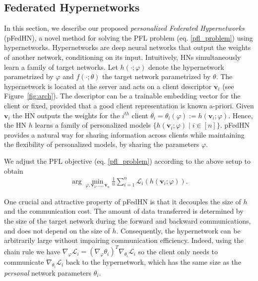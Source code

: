 \documentclass{article}
\def\gL{{\mathcal{L}}}
\newcommand{\bv}{\boldsymbol{v}}
\newcommand\ourmethod{pFedHN}
\begin{document}
\subsection{Federated Hypernetworks}
\label{fhn}



In this section,  we describe our proposed \textit{personalized Federated Hypernetworks} (\ourmethod{}), a novel method for solving the PFL problem (eq. \ref{pfl_problem}) using hypernetworks.
Hypernetworks are deep neural networks that output the weights of another network, conditioning on its input. Intuitively, HNs simultaneously learn a family of target networks.
Let $h(\cdot;\varphi)$ denote the hypernetwork parametrized by $\varphi$ and $f(\cdot;\theta)$ the target network parametrized by $\theta$. 
The hypernetwork is located at the server and acts on a client descriptor $\bv_i$ (see Figure~\ref{fig:arch}). The descriptor can be a trainable embedding vector for the client or fixed, provided that a good client representation is known a-priori. Given $\bv_i$ the HN outputs the weights for the $i^{th}$ client $\theta_i=\theta_i(\varphi):=h(\bv_i;\varphi)$. Hence, the HN $h$ learns a family of personalized models $\{h(\bv_i;\varphi)\mid i\in [n]\}$. \ourmethod{} provides a natural way for sharing information across clients while maintaining the flexibility of personalized models, by sharing the parameters $\varphi$.

We adjust the PFL objective (eq. \ref{pfl_problem}) according to the above setup to obtain
\begin{align}\label{fhn_problem}
    \arg\min_{\varphi,\bv_1,...,\bv_n} \frac{1}{n} \sum_{i=1}^n \gL_i(h(\bv_i;\varphi)).
\end{align}

One crucial and attractive property of \ourmethod{} is that it decouples the size of $h$ and the communication cost. The amount of data transferred is determined by the size of the target network during the forward and backward communications, and does not depend on the size of $h$. Consequently, the hypernetwork can be arbitrarily large without impairing communication efficiency. Indeed, using the chain rule we have $\nabla_\varphi\gL_i=(\nabla_{\varphi}\theta_i)^T\nabla_{\theta_i}\gL_i$ so the client only needs to communicate $\nabla_{\theta_i}\gL_i$ back to the hypernetwork, which has the same size as the \textit{personal} network parameters $\theta_i$. 
\end{document}
